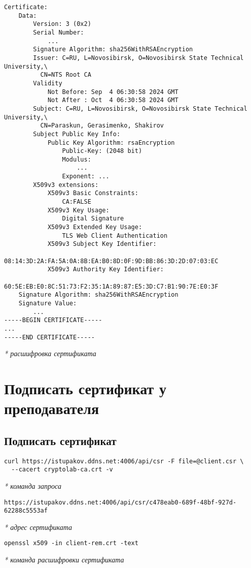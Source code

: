 \documentclass[12pt, a4paper]{article}
\begin{document}
\begin{verbatim}
Certificate:
    Data:
        Version: 3 (0x2)
        Serial Number:
            ...
        Signature Algorithm: sha256WithRSAEncryption
        Issuer: C=RU, L=Novosibirsk, O=Novosibirsk State Technical University,\
          CN=NTS Root CA
        Validity
            Not Before: Sep  4 06:30:58 2024 GMT
            Not After : Oct  4 06:30:58 2024 GMT
        Subject: C=RU, L=Novosibirsk, O=Novosibirsk State Technical University,\
          CN=Paraskun, Gerasimenko, Shakirov
        Subject Public Key Info:
            Public Key Algorithm: rsaEncryption
                Public-Key: (2048 bit)
                Modulus:
                    ...
                Exponent: ...
        X509v3 extensions:
            X509v3 Basic Constraints:
                CA:FALSE
            X509v3 Key Usage:
                Digital Signature
            X509v3 Extended Key Usage:
                TLS Web Client Authentication
            X509v3 Subject Key Identifier:
                08:14:3D:2A:FA:5A:0A:8B:EA:B0:8D:0F:9D:BB:86:3D:2D:07:03:EC
            X509v3 Authority Key Identifier:
                60:5E:EB:E0:8C:51:73:F2:35:1A:89:87:E5:3D:C7:B1:90:7E:E0:3F
    Signature Algorithm: sha256WithRSAEncryption
    Signature Value:
        ...
-----BEGIN CERTIFICATE-----
...
-----END CERTIFICATE-----
\end{verbatim}
\textit{* расшифровка сертификата}

\section{Подписать сертификат у преподавателя}
\subsection{Подписать сертификат}

\begin{verbatim}
curl https://istupakov.ddns.net:4006/api/csr -F file=@client.csr \
  --cacert cryptolab-ca.crt -v 
\end{verbatim}
\textit{* команда запроса}

\begin{verbatim}
https://istupakov.ddns.net:4006/api/csr/c478eab0-689f-48bf-927d-62288c5553af
\end{verbatim}
\textit{* адрес сертификата}

\begin{verbatim}
openssl x509 -in client-rem.crt -text 
\end{verbatim}
\textit{* команда расшифровки сертификата}
\end{document}
